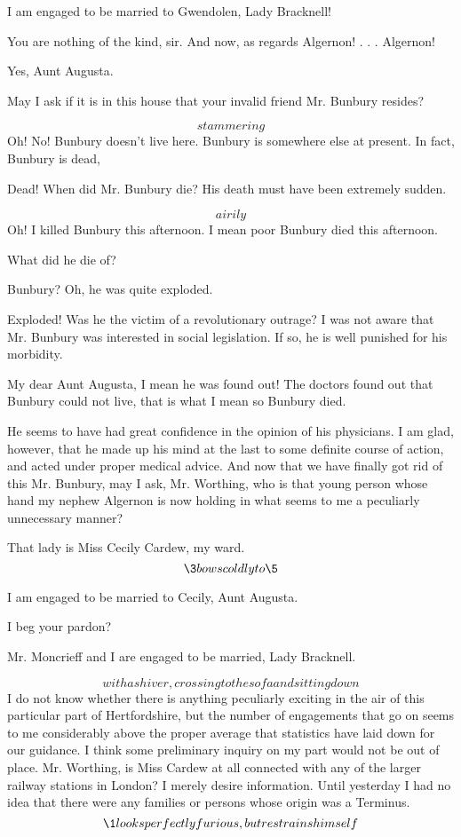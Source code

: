 \documentclass{book}
\begin{document}
\1  I am engaged to be married to Gwendolen, Lady Bracknell!

\3  You are nothing of the kind, sir.  And now, as
regards Algernon! . . . Algernon!

\2  Yes, Aunt Augusta.

\3  May I ask if it is in this house that your invalid
friend Mr. Bunbury resides?

\2  \[stammering\]  Oh!  No!  Bunbury doesn't live here.
Bunbury is somewhere else at present.  In fact, Bunbury is dead,

\3  Dead!  When did Mr. Bunbury die?  His death must
have been extremely sudden.

\2  \[airily\]  Oh!  I killed Bunbury this afternoon.  I mean
poor Bunbury died this afternoon.

\3  What did he die of?

\2  Bunbury?  Oh, he was quite exploded.

\3  Exploded!  Was he the victim of a revolutionary
outrage?  I was not aware that Mr. Bunbury was interested in social
legislation.  If so, he is well punished for his morbidity.

\2  My dear Aunt Augusta, I mean he was found out!  The
doctors found out that Bunbury could not live, that is what I mean
\textemdash so Bunbury died.

\3  He seems to have had great confidence in the
opinion of his physicians.  I am glad, however, that he made up his
mind at the last to some definite course of action, and acted under
proper medical advice.  And now that we have finally got rid of
this Mr. Bunbury, may I ask, Mr. Worthing, who is that young person
whose hand my nephew Algernon is now holding in what seems to me a
peculiarly unnecessary manner?

\1  That lady is Miss Cecily Cardew, my ward.  \[\3
bows coldly to \5\]

\2  I am engaged to be married to Cecily, Aunt Augusta.

\3  I beg your pardon?

\5  Mr. Moncrieff and I are engaged to be married, Lady
Bracknell.

\3  \[with a shiver, crossing to the sofa and sitting
down\]  I do not know whether there is anything peculiarly exciting
in the air of this particular part of Hertfordshire, but the number
of engagements that go on seems to me considerably above the proper
average that statistics have laid down for our guidance.  I think
some preliminary inquiry on my part would not be out of place.  Mr.
Worthing, is Miss Cardew at all connected with any of the larger
railway stations in London?  I merely desire information.  Until
yesterday I had no idea that there were any families or persons
whose origin was a Terminus.  \[\1 looks perfectly furious, but
restrains himself\]
\end{document}
